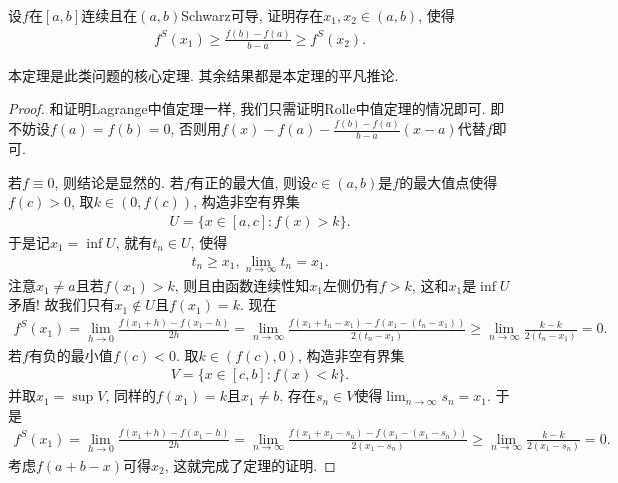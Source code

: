 \documentclass[../../main.tex]{subfiles}
\begin{document}
\begin{theorem}[Schwarz导数的Lagrange中值定理]\label{theorem:Schwarz导数的Lagrange中值定理}
设$f$在$[a,b]$连续且在$(a,b)$Schwarz可导, 证明存在$x_1,x_2 \in (a,b)$, 使得
\begin{align}
f^S(x_1) \geqslant \frac{f(b) - f(a)}{b - a} \geqslant f^S(x_2). \label{eq:13.2348982334242te3fd938523i23903t3ger34t4234898938523i23903t3ger34t4107}
\end{align}
\end{theorem}
\begin{note}
本定理是此类问题的核心定理. 其余结果都是本定理的平凡推论.
\end{note}
\begin{proof}
和证明Lagrange中值定理一样, 我们只需证明Rolle中值定理的情况即可. 即不妨设$f(a) = f(b) = 0$, 否则用$f(x) - f(a) - \frac{f(b)-f(a)}{b - a}(x - a)$代替$f$即可.

若$f \equiv 0$, 则结论是显然的. 若$f$有正的最大值, 则设$c \in (a,b)$是$f$的最大值点使得$f(c) > 0$, 取$k \in (0,f(c))$, 构造非空有界集
\begin{align*}
U = \{x \in [a,c] : f(x) > k\}.
\end{align*}
于是记$x_1 = \inf U$, 就有$t_n \in U$, 使得
\begin{align*}
t_n \geqslant x_1, \lim_{n \to \infty} t_n = x_1.
\end{align*}
注意$x_1 \neq a$且若$f(x_1) > k$, 则且由函数连续性知$x_1$左侧仍有$f > k$, 这和$x_1$是$\inf U$矛盾! 故我们只有$x_1 \notin U$且$f(x_1) = k$.
现在
\begin{align*}
f^S(x_1) = \lim_{h \to 0} \frac{f(x_1 + h) - f(x_1 - h)}{2h} = \lim_{n \to \infty} \frac{f(x_1 + t_n - x_1) - f(x_1 - (t_n - x_1))}{2(t_n - x_1)} \geqslant \lim_{n \to \infty} \frac{k - k}{2(t_n - x_1)} = 0.
\end{align*}
若$f$有负的最小值$f(c) < 0$. 取$k \in (f(c),0)$, 构造非空有界集
\begin{align*}
V = \{x \in [c,b] : f(x) < k\}.
\end{align*}
并取$x_1 = \sup V$, 同样的$f(x_1) = k$且$x_1 \neq b$. 存在$s_n \in V$使得$\lim_{n \to \infty} s_n = x_1$. 于是
\begin{align*}
f^S(x_1) = \lim_{h \to 0} \frac{f(x_1 + h) - f(x_1 - h)}{2h} = \lim_{n \to \infty} \frac{f(x_1 + x_1 - s_n) - f(x_1 - (x_1 - s_n))}{2(x_1 - s_n)} \geqslant \lim_{n \to \infty} \frac{k - k}{2(x_1 - s_n)} = 0.
\end{align*}
考虑$f(a + b - x)$可得$x_2$, 这就完成了定理的证明.
\end{proof}
\end{document}
